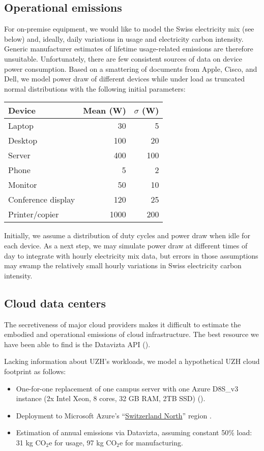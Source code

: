 \documentclass[11pt]{article}
\begin{document}
\subsection{Operational emissions}

For on-premise equipment, we would like to model the Swiss electricity mix (see below) and, ideally,
daily variations in usage and electricity carbon intensity.
Generic manufacturer estimates of lifetime usage-related emissions are therefore unsuitable.
Unfortunately, there are few consistent sources of data on device power consumption.
Based on a smattering of documents from Apple, Cisco, and Dell, we model
power draw of different devices while under load as truncated normal distributions with the
following initial parameters:

\begin{center}
\begin{tabular}{|l|r|r|}
\hline
\textbf{Device} & \textbf{Mean (W)} & \textbf{$\sigma$ (W)} \\ \hline
Laptop & 30 & 5 \\ \hline
Desktop & 100 & 20 \\ \hline
Server & 400 & 100 \\ \hline
Phone & 5 & 2 \\ \hline
Monitor & 50 & 10 \\ \hline
Conference display & 120 & 25 \\ \hline
Printer/copier & 1000 & 200 \\ \hline
\end{tabular}
\end{center}

Initially, we assume a distribution of duty cycles and power draw when idle for each device.
As a next step, we may simulate power draw at different times of day to integrate with
hourly electricity mix data, but errors in those assumptions may swamp the relatively small
hourly variations in Swiss electricity carbon intensity.

\subsection{Cloud data centers}

The secretiveness of major cloud providers makes it difficult to estimate the embodied and operational emissions of cloud
infrastructure. The best resource we have been able to find is the Datavizta API (\textcite{boavizta}).

Lacking information about UZH's workloads, we model a hypothetical UZH cloud footprint as follows:
\begin{itemize}
    \item One-for-one replacement of one campus server with one Azure D8S\_v3 instance (2x Intel
      Xeon, 8 cores, 32 GB RAM, 2TB SSD) (\cite{msftvms}).
    \item Deployment to Microsoft Azure's ``\href{https://datacenters.microsoft.com/globe/explore?info=region_switzerlandnorth}{Switzerland North}'' region .
    \item Estimation of annual emissions via Datavizta, assuming constant 50\% load: 31 kg CO$_2$e for usage,
      97 kg CO$_2$e for manufacturing.
\end{itemize}
\end{document}
